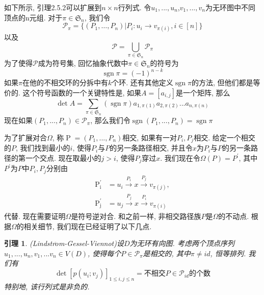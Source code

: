 \documentclass{ctexbook}
\newtheorem{lem}[thm]{引理}
\begin{document}
	如下所示, 引理2.5.2可以扩展到$n\times n$行列式. 令$u_{1},...,u_{n}$,$v_{1},...,v_{n}$为无环图中不同顶点的n元组. 对于$\pi \in \mathfrak{S}_{n}$, 我们令
\[
	\mathcal{P}_{\pi}=\{(P_{1},\ldots,P_{n})|P_{i}:u_{i}\rightarrow v_{\pi(i)},i\in [n]\}
\]
	以及
\[
	\mathcal{P}=\bigcup_{\pi \in \mathfrak{S}_{n}}\mathcal{P}_{\pi}
\]
	为了使得$\mathcal{P}$成为符号集, 回忆抽象代数中$\pi \in \mathfrak{S}_{n}$的符号为
\[
	\operatorname{sgn}\pi =(-1)^{n-k}
\]
	如果$\pi$在他的不相交环的分拆中有$k$个环. 还有其他定义$\operatorname{sgn}\pi$的方法, 但他们都是等价的. 这个符号函数的一个关键特性是, 如果$A=[a_{i,j}]$是一个矩阵, 那么
\[
	\operatorname{det}A=\sum_{\pi \in \mathfrak{S}_{n}}(\operatorname{sgn}\pi)a_{1,\pi(1)}a_{2,\pi(2)}...a_{n,\pi(n)}
\]
	现在如果$(P_{1},...,P_{n})\in \mathcal{P}_{\pi}$, 那么我们令$\operatorname{sgn}(P_{1},...,P_{n})=\operatorname{sgn}\pi$

	为了扩展对合$\Omega$, 称$\operatorname{P}=(P_{1},...,P_{n})$相交, 如果有一对$P_{i},P_{j}$相交. 给定一个相交的$P$, 我们找到最小的$i$, 使得$P_{i}$与$P$的另一条路径相交, 并且令$x$为$P_{i}$与$P$的另一条路径的第一个交点. 现在取最小的$j>i$, 使得$P_{j}$穿过$x$. 我们现在令$\Omega(P)=P^{'}$, 其中$P^{'}$为$P$中$P_{i},P_{j}$分别由
\begin{equation}
\begin{aligned}
\operatorname{P_{i}^{'}}& =u_{i}\stackrel{P_{i}}{\longrightarrow} x\stackrel{P_{j}}{\longrightarrow} v_{\pi(j)},\\
\operatorname{P_{j}^{'}}& =u_{j}\stackrel{P_{j}}{\longrightarrow} x\stackrel{P_{i}}{\longrightarrow} v_{\pi(i)}
\end{aligned}
\end{equation}
	代替. 现在需要证明$\Omega$是符号逆对合. 和之前一样, 非相交路径族$P$是$\Omega$的不动点. 根据$\Omega$的相关细节, 我们现在已经证明了以下几点.
\begin{lem}
	(Lindstr$\ddot{o}$m-Gessel-Viennot)设$D$为无环有向图. 考虑两个顶点序列$u_{1},...,u_{n},v_{1},...v_{n}\in V(D)$, 使得每个$P\in \mathcal{P}_{\pi}$是相交的, 其中$\pi \not=id$, 恒等排列. 我们有
	\[
	\operatorname{det}[p(u_{i};v_{j})]_{1\leq i,j\leq n}=\text{不相交}P\in \mathcal{P}_{id}\text{的个数}
	\]
	特别地, 该行列式是非负的. 
\end{lem}
\end{document}
